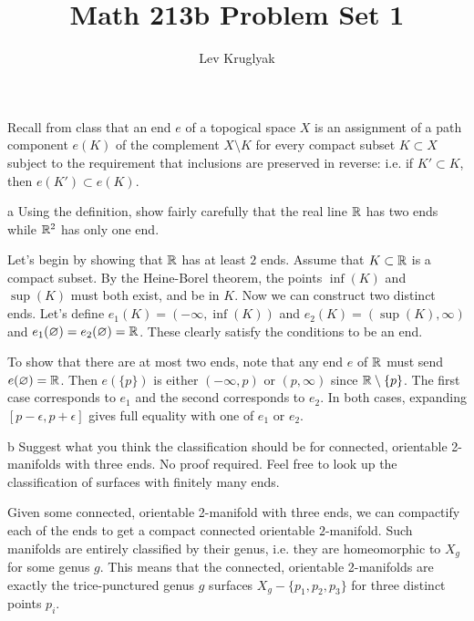 \documentclass{pset}
\title{Math 213b Problem Set 1}
\author{Lev Kruglyak}
\begin{document}
\maketitle
\collaborators

\begin{problem}{1}
  Recall from class that an end $e$ of a topogical space $X$ is an assignment of a path component $e(K)$ of the complement $X\setminus K$ for every compact subset $K\subset X$ subject to the requirement that inclusions are preserved in reverse: i.e. if $K'\subset K$, then $e(K')\subset e(K)$.
\end{problem}

\begin{parts}
  \begin{part}{a}
    Using the definition, show fairly carefully that the real line $\mathbb{R}$ has two ends while $\mathbb{R}^2$ has only one end.
  \end{part}

  Let's begin by showing that $\mathbb{R}$ has at least $2$ ends. Assume that $K\subset \mathbb{R}$ is a compact subset. By the Heine-Borel theorem, the points $\inf(K)$ and $\sup(K)$ must both exist, and be in $K$. Now we can construct two distinct ends. Let's define $e_1(K) = (-\infty, \inf(K))$ and $e_2(K) = (\sup(K), \infty)$ and $e_1(\varnothing) = e_2(\varnothing)=\mathbb{R}$. These clearly satisfy the conditions to be an end.

  To show that there are at most two ends, note that any end $e$ of $\mathbb{R}$ must send $e(\varnothing) = \mathbb{R}$. Then $e(\{p\})$ is either $(-\infty, p)$ or $(p, \infty)$ since $\mathbb{R}\setminus \{p\}$. The first case corresponds to $e_1$ and the second corresponds to $e_2$. In both cases, expanding $[p-\epsilon, p+\epsilon]$ gives full equality with one of $e_1$ or $e_2$.

  \begin{part}{b}
    Suggest what you think the classification should be for connected, orientable
    2-manifolds with three ends. No proof required. Feel free to look up the classification of surfaces with finitely many ends.
  \end{part}

  Given some connected, orientable 2-manifold with three ends, we can compactify each of the ends to get a compact connected orientable $2$-manifold. Such manifolds are entirely classified by their genus, i.e. they are homeomorphic to $X_g$ for some genus $g$. This means that the connected, orientable 2-manifolds are exactly the trice-punctured genus $g$ surfaces $X_g - \{p_1, p_2, p_3\}$ for three distinct points $p_i$.
\end{parts}
\end{document}
